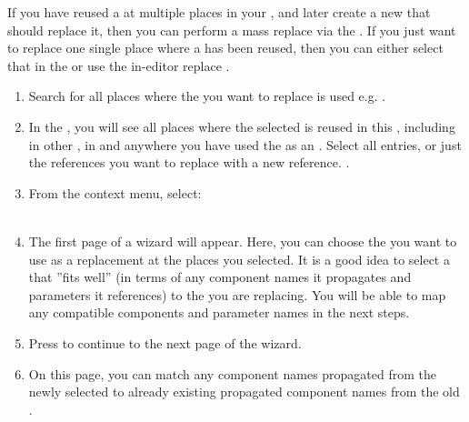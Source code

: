 If you have reused a \gdcase{} at multiple places in your \gdproject{}, and later create a new \gdcase{} that should replace it, then you can perform a mass replace via the \gdsearchresultview{}. If you just want to replace one single place where a  \gdcase{} has been reused, then you can either select that \gdcase{} in the \gdsearchresultview{} or use the in-editor replace .  


\begin{enumerate}
\item Search for all places where the \gdcase{} you want to replace is used e.g.  . 
\item In the \gdsearchresultview{}, you will see all places where the selected \gdcase{} is reused in this \gdproject{}, including in other \gdcases{}, in \gdsuites{} and anywhere you have used the \gdcase{} as an \gdehandler{}. Select all entries, or just the \gdcase{} references you want to replace with a new \gdcase{} reference. 
.
\item From the context menu, select:\\
\\
\item The first page of a wizard will appear. Here, you can choose the \gdcase{} you want to use as a replacement at the places you selected. It is a good idea to select a \gdcase{} that ''fits well'' (in terms of any component names it propagates and parameters it references) to the \gdcase{} you are replacing. You will be able to map any compatible components and parameter names in the next steps. 
\item Press  to continue to the next page of the wizard.
\item On this page, you can match any component names propagated  from the newly selected \gdcase{} to already existing propagated component names from the old \gdcase{}.    

\end{enumerate}
